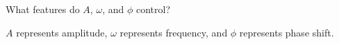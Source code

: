 What features do $A$, $\omega$, and $\phi$ control?

\begin{solution}
    $A$ represents amplitude, $\omega$ represents frequency, and $\phi$ represents phase shift.
\end{solution}
